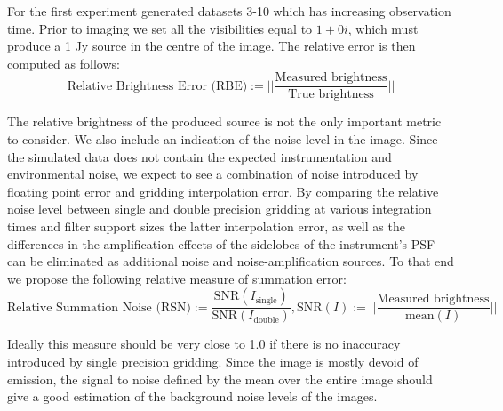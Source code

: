 For the first experiment generated datasets 3-10 which has increasing observation time. Prior to imaging we set all the visibilities equal to $1+0i$, which must produce a 1 Jy source in the centre of the image. The relative error is then computed as
follows:
\begin{equation}
 \text{Relative Brightness Error (RBE)} := ||\frac{\text{Measured brightness}}{\text{True brightness}}||
\end{equation}

The relative brightness of the produced source is not the only important metric to consider. We also include an indication of the noise level in the image. Since the simulated data does not contain the expected
instrumentation and environmental noise, we expect to see a combination of noise introduced by floating point error and gridding interpolation error. By comparing the relative noise level between single and double 
precision gridding at various integration times and filter support sizes the latter interpolation error, as well as the differences in the amplification effects of the sidelobes of the instrument's PSF can be 
eliminated as additional noise and noise-amplification sources. To that end we propose the following relative measure of summation error:
\begin{equation}
 \text{Relative Summation Noise (RSN)} := \frac{\text{SNR}(I_\text{single})}{\text{SNR}(I_\text{double})}, \text{SNR}(I) := ||\frac{\text{Measured brightness}}{\text{mean}(I)}||
\end{equation}

Ideally this measure should be very close to 1.0 if there is no inaccuracy introduced by single precision gridding. Since the image is mostly devoid of emission, the signal to noise defined by the mean
over the entire image should give a good estimation of the background noise levels of the images.
